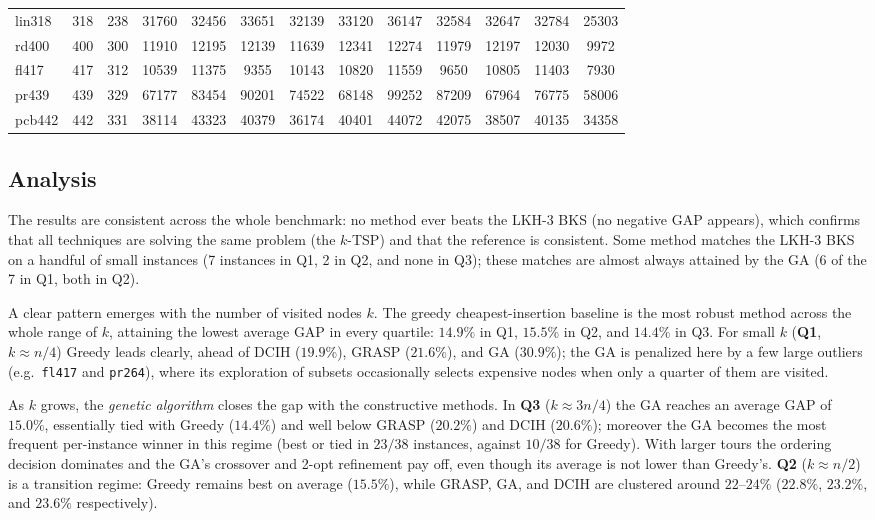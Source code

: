 \documentclass[conference]{IEEEtran}
\begin{document}
\begin{table}[htbp]
{{\begin{tabular}{|l|c|c|c|c|c|c|c|c|c|c|c|c|}
lin318 & 318 & 238 & 31760 & 32456 & 33651 & 32139 & 33120 & 36147 & 32584 & 32647 & 32784 & 25303 \\
rd400 & 400 & 300 & 11910 & 12195 & 12139 & 11639 & 12341 & 12274 & 11979 & 12197 & 12030 & 9972 \\
fl417 & 417 & 312 & 10539 & 11375 & 9355 & 10143 & 10820 & 11559 & 9650 & 10805 & 11403 & 7930 \\
pr439 & 439 & 329 & 67177 & 83454 & 90201 & 74522 & 68148 & 99252 & 87209 & 67964 & 76775 & 58006 \\
pcb442 & 442 & 331 & 38114 & 43323 & 40379 & 36174 & 40401 & 44072 & 42075 & 38507 & 40135 & 34358 \\
\hline
\end{tabular}}}
\end{table}

\subsection*{Analysis}
The results are consistent across the whole benchmark: no method ever beats the LKH-3 BKS (no negative GAP appears), which confirms that all techniques are solving the same problem (the $k$-TSP) and that the reference is consistent. Some method matches the LKH-3 BKS on a handful of small instances (7 instances in Q1, 2 in Q2, and none in Q3); these matches are almost always attained by the GA (6 of the 7 in Q1, both in Q2).

A clear pattern emerges with the number of visited nodes $k$. The greedy cheapest-insertion baseline is the most robust method across the whole range of $k$, attaining the lowest average GAP in every quartile: $14.9\%$ in Q1, $15.5\%$ in Q2, and $14.4\%$ in Q3. For small $k$ (\textbf{Q1}, $k\approx n/4$) Greedy leads clearly, ahead of DCIH ($19.9\%$), GRASP ($21.6\%$), and GA ($30.9\%$); the GA is penalized here by a few large outliers (e.g.\ \texttt{fl417} and \texttt{pr264}), where its exploration of subsets occasionally selects expensive nodes when only a quarter of them are visited.

As $k$ grows, the \emph{genetic algorithm} closes the gap with the constructive methods. In \textbf{Q3} ($k\approx 3n/4$) the GA reaches an average GAP of $15.0\%$, essentially tied with Greedy ($14.4\%$) and well below GRASP ($20.2\%$) and DCIH ($20.6\%$); moreover the GA becomes the most frequent per-instance winner in this regime (best or tied in $23/38$ instances, against $10/38$ for Greedy). With larger tours the ordering decision dominates and the GA's crossover and 2-opt refinement pay off, even though its average is not lower than Greedy's. \textbf{Q2} ($k\approx n/2$) is a transition regime: Greedy remains best on average ($15.5\%$), while GRASP, GA, and DCIH are clustered around $22$--$24\%$ ($22.8\%$, $23.2\%$, and $23.6\%$ respectively).
\end{document}
